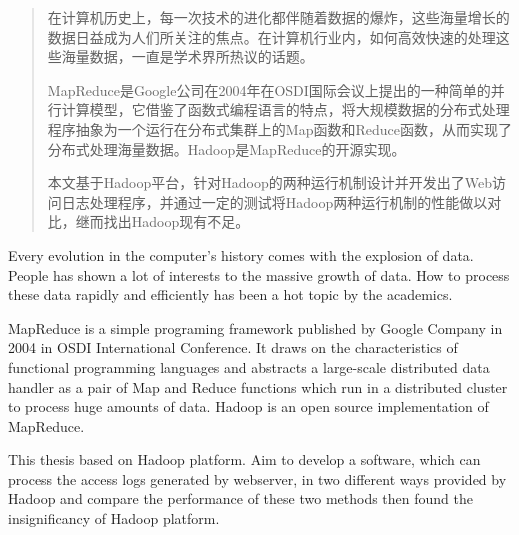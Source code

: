 \begin{abstract}
在计算机历史上，每一次技术的进化都伴随着数据的爆炸，这些海量增长的数据日益成为人们所关注的焦点。在计算机行业内，如何高效快速的处理这些海量数据，一直是学术界所热议的话题。

MapReduce是Google公司在2004年在OSDI国际会议上提出的一种简单的并行计算模型，它借鉴了函数式编程语言的特点，将大规模数据的分布式处理程序抽象为一个运行在分布式集群上的Map函数和Reduce函数，从而实现了分布式处理海量数据。Hadoop是MapReduce的开源实现。

本文基于Hadoop平台，针对Hadoop的两种运行机制设计并开发出了Web访问日志处理程序，并通过一定的测试将Hadoop两种运行机制的性能做以对比，继而找出Hadoop现有不足。

\end{abstract}

\begin{englishabstract}
Every evolution in the computer's history comes with the explosion of data. People has shown a lot of interests to the massive growth of data. How to process these data rapidly and efficiently has been a hot topic by the academics. 

MapReduce is a simple programing framework published by Google Company in 2004 in OSDI International Conference. It draws on the characteristics of functional programming languages​​ and abstracts a large-scale distributed data handler as a pair of Map and Reduce functions which run in a distributed cluster to process huge amounts of data. Hadoop is an open source implementation of MapReduce.

This thesis based on Hadoop platform. Aim to develop a software, which can process the access logs generated by webserver, in two different ways provided by Hadoop and compare the performance of these two methods then found the insignificancy of Hadoop platform.

\end{englishabstract}

